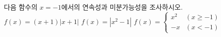 다음 함수의 $x=-1$에서의 연속성과 미분가능성을 조사하시오.
 $f(x)=(x+1)|x+1|$
 $f(x)=|x^2-1|$
 $f(x)=\begin{cases} x^2 & (x\ge -1) \\ -x & (x<-1) \end{cases}$
